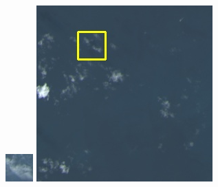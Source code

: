 \documentclass[10pt]{ctexart}
\begin{document}
\begin{multicols}{2}
\begin{figure}[H]
{\begin{minipage}[b]{0.15\linewidth}
            \includegraphics[width=1\linewidth]{../log/spoon2/cut2/tmp_cut_LC81620432014072LGN00_16237_color.jpg}\vspace{4pt}
            \includegraphics[width=1\linewidth]{../log/spoon2/cut2/LC81620432014072LGN00_16329_color.jpg}\vspace{4pt}

\end{minipage}}
\end{figure}
\end{multicols}
\end{document}
